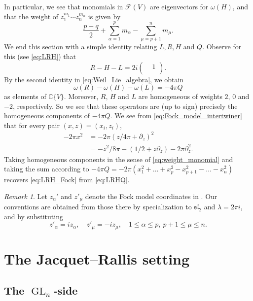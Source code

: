 \documentclass[reqno, 11pt]{amsart} %
\numberwithin{equation}{section}
\theoremstyle{plain}
\theoremstyle{definition}
\theoremstyle{remark}
\newtheorem{remark}[theorem]{Remark}
\newcommand{\mbC}{\mathbb{C}}
\newcommand{\mcF}{\mathcal{F}}
\newcommand{\mfl}{\mathfrak{l}}
\newcommand{\mfs}{\mathfrak{s}}
\newcommand{\mfsl}{\mfs\mfl}
\DeclareMathOperator{\GL}{GL}
\begin{document}
In particular, we see that monomials in $\mcF(V)$ are eigenvectors for $ω(H)$, and that the weight of $z_1^{m_1}\cdots z_n^{m_n}$ is given by
\begin{equation}\label{eq:weight_monomial}
\frac{p-q}{2} + \sum_{α = 1}^p m_α - \sum_{μ = p+1}^n m_μ.
\end{equation}
We end this section with a simple identity relating $L, R, H$ and $Q$. Observe for this (see \eqref{eq:LRH}) that
$$R - H - L = 2i\begin{pmatrix}
& 1\\ &
\end{pmatrix}.$$
By the second identity in \eqref{eq:Weil_Lie_algebra}, we obtain
\begin{equation}\label{eq:LRHQ}
ω(R) - ω(H) - ω(L) = -4πQ
\end{equation}
as elements of $\mbC\{V\}$. Moreover, $R$, $H$ and $L$ are homogeneous of weights $2$, $0$ and $-2$, respectively. So we see that these operators are (up to sign) precisely the homogeneous components of $-4πQ$. We see from \eqref{eq:Fock_model_intertwiner} that for every pair $(x,z) = (x_i, z_i)$,
$$\begin{aligned}
-2π x^2 & = -2π (z/4π + \partial_z)^2\\
& = -z^2/8π - (1/2 + z\partial_z) - 2π\partial_z^2.
\end{aligned}$$
Taking homogeneous components in the sense of \eqref{eq:weight_monomial} and taking the sum according to $-4πQ = -2π(x_1^2 + \ldots +x_p^2 - x_{p+1}^2 -\ldots-x_n^2)$ recovers \eqref{eq:LRH_Fock} from \eqref{eq:LRHQ}.

\begin{remark}\label{rmk:compatib_FM}
Let $z_α'$ and $z'_μ$ denote the Fock model coordinates in \cite[Appendix A]{FunkeMillson}. Our conventions are obtained from those there by specialization to $\mfsl_2$ and $λ = 2πi$, and by substituting
$$z'_α = iz_α,\quad z'_μ = -iz_μ,\quad 1\leq α \leq p,\ p+1\leq μ \leq n.$$
\end{remark}

\section{The Jacquet--Rallis setting}

\subsection{The $\GL_n$-side}
\end{document}
